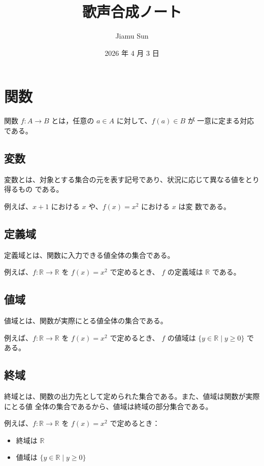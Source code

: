 \documentclass[11pt]{ltjsreport}
\title{歌声合成ノート}
\author{Jiamu Sun}
\date{2026 年 4 月 3 日}
\begin{document}
\maketitle

\setcounter{chapter}{0}
\chapter{関数}

関数 \( f : A \to B \) とは，任意の \( a \in A \) に対して、\( f(a) \in B \) が
一意に定まる対応である。

\section{変数}

変数とは、対象とする集合の元を表す記号であり、状況に応じて異なる値をとり得るもの
である。

例えば、\( x + 1 \) における \( x \) や、\( f(x) = x^2 \) における \( x \) は変
数である。

\section{定義域}

定義域とは、関数に入力できる値全体の集合である。

例えば、\( f : \mathbb{R} \to \mathbb{R} \) を \( f(x) = x^2 \) で定めるとき、
\( f \) の定義域は \( \mathbb{R} \) である。

\section{値域}

値域とは、関数が実際にとる値全体の集合である。

例えば、\( f : \mathbb{R} \to \mathbb{R} \) を \( f(x) = x^2 \) で定めるとき、
\( f \) の値域は \( \{ y \in \mathbb{R} \mid y \ge 0 \} \) である。

\section{終域}

終域とは、関数の出力先として定められた集合である。また、値域は関数が実際にとる値
全体の集合であるから、値域は終域の部分集合である。

例えば、\( f : \mathbb{R} \to \mathbb{R} \) を \( f(x) = x^2 \) で定めるとき：

\begin{itemize}
   \item 終域は \( \mathbb{R} \)
   \item 値域は \( \{ y \in \mathbb{R} \mid y \ge 0 \} \)
\end{itemize}
\end{document}
